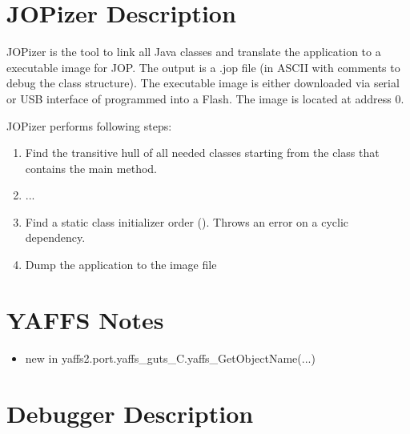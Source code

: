 \section{JOPizer Description}

JOPizer is the tool to link all Java classes and translate the
application to a executable image for JOP. The output is a .jop file
(in ASCII with comments to debug the class structure). The
executable image is either downloaded via serial or USB interface of
programmed into a Flash. The image is located at address 0.

JOPizer performs following steps:

\begin{enumerate}
    \item Find the transitive hull of all needed classes starting
    from the class that contains the main method.
    \item ...
    \item Find a static class initializer order
    (). Throws an error on a cyclic dependency.
    \item Dump the application to the image file
\end{enumerate}

\section{YAFFS Notes}

\begin{itemize}
    \item new in yaffs2.port.yaffs\_guts\_C.yaffs\_GetObjectName(...)
\end{itemize}

\section{Debugger Description}

